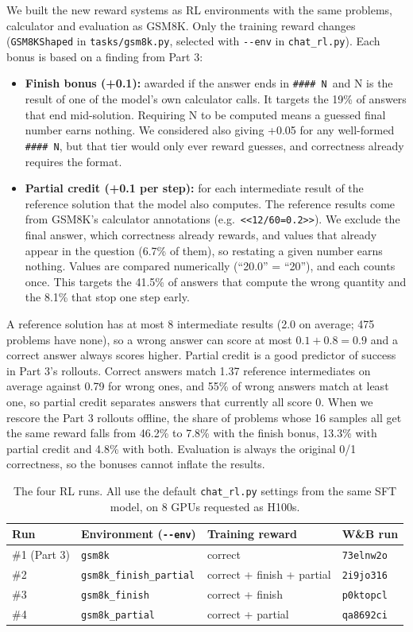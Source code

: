 \documentclass[11pt]{article}
\newcommand{\code}[1]{\texttt{#1}}
\newcommand{\ans}{\code{\#\#\#\#~N}}
\begin{document}
We built the new reward systems as RL environments with the same problems, calculator and evaluation as GSM8K. Only the training reward changes (\code{GSM8KShaped} in \code{tasks/gsm8k.py}, selected with \code{-{}-env} in \code{chat\_rl.py}). Each bonus is based on a finding from Part 3:
\begin{itemize}
  \item \textbf{Finish bonus (+0.1):} awarded if the answer ends in \ans\ and N is the result of one of the model's own calculator calls. It targets the 19\% of answers that end mid-solution. Requiring N to be computed means a guessed final number earns nothing. We considered also giving +0.05 for any well-formed \ans, but that tier would only ever reward guesses, and correctness already requires the format.
  \item \textbf{Partial credit (+0.1 per step):} for each intermediate result of the reference solution that the model also computes. The reference results come from GSM8K's calculator annotations (e.g.\ \code{<<12/60=0.2>>}). We exclude the final answer, which correctness already rewards, and values that already appear in the question (6.7\% of them), so restating a given number earns nothing. Values are compared numerically (``20.0'' = ``20''), and each counts once. This targets the 41.5\% of answers that compute the wrong quantity and the 8.1\% that stop one step early.
\end{itemize}
A reference solution has at most 8 intermediate results (2.0 on average; 475 problems have none), so a wrong answer can score at most $0.1 + 0.8 = 0.9$ and a correct answer always scores higher. Partial credit is a good predictor of success in Part 3's rollouts. Correct answers match 1.37 reference intermediates on average against 0.79 for wrong ones, and 55\% of wrong answers match at least one, so partial credit separates answers that currently all score 0. When we rescore the Part 3 rollouts offline, the share of problems whose 16 samples all get the same reward falls from 46.2\% to 7.8\% with the finish bonus, 13.3\% with partial credit and 4.8\% with both. Evaluation is always the original 0/1 correctness, so the bonuses cannot inflate the results.

\begin{table}[H]
\centering
\small
\renewcommand{\arraystretch}{1.15}
\caption{The four RL runs. All use the default \code{chat\_rl.py} settings from the same SFT model, on 8 GPUs requested as H100s.}\label{tab:runs}
\begin{tabular}{l l l l}
\toprule
\textbf{Run} & \textbf{Environment (\code{-{}-env})} & \textbf{Training reward} & \textbf{W\&B run} \\
\midrule
\#1 (Part 3) & \code{gsm8k} & correct & \code{73elnw2o} \\
\#2 & \code{gsm8k\_finish\_partial} & correct + finish + partial & \code{2i9jo316} \\
\#3 & \code{gsm8k\_finish} & correct + finish & \code{p0ktopcl} \\
\#4 & \code{gsm8k\_partial} & correct + partial & \code{qa8692ci} \\
\bottomrule
\end{tabular}
\end{table}
\end{document}

